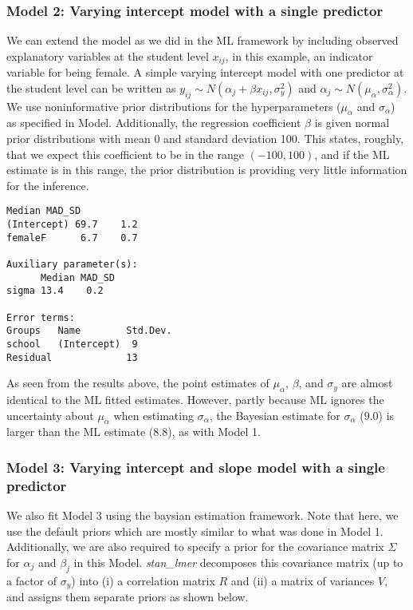 \subsubsection*{Model 2: Varying intercept model with a single predictor}
We can extend the model as we did in the ML framework by including observed explanatory variables at the student level $x_{ij}$, in this example, an indicator variable for being female. A simple varying intercept model with one predictor at the student level can be written as $y_{ij} \sim N(\alpha_{j} + \beta x_{ij}, \sigma_{y}^{2})$ and $\alpha_{j} \sim N(\mu_{\alpha}, \sigma_{\alpha}^{2})$. We use noninformative prior distributions for the hyperparameters ($\mu_{\alpha}$ and $\sigma_{\alpha}$) as specified in Model. Additionally, the regression coefficient $\beta$ is given normal prior distributions with mean 0 and standard deviation 100. This states, roughly, that we expect this coefficient to be in the range $(-100, 100)$, and if the ML estimate is in this range, the prior distribution is providing very little information for the inference.  

\newpage
\begin{Verbatim}[frame=single]
            Median MAD_SD
(Intercept) 69.7    1.2  
femaleF      6.7    0.7  

Auxiliary parameter(s):
      Median MAD_SD
sigma 13.4    0.2  

Error terms:
Groups   Name        Std.Dev.
school   (Intercept)  9      
Residual             13    
\end{Verbatim}
As seen from the results above, the point estimates of $\mu_{\alpha}$, $\beta$, and $\sigma_{y}$ are almost identical to the ML fitted estimates. However, partly because ML ignores the uncertainty about $\mu_{\alpha}$ when estimating $\sigma_{\alpha}$, the Bayesian estimate for $\sigma_{\alpha}$ ($9.0$) is larger than the ML estimate ($8.8$), as with Model 1.

\subsubsection*{Model 3: Varying intercept and slope model with a single predictor}

We also fit Model 3 using the baysian estimation framework.  Note that here, we use the default priors which are mostly similar to what was done in Model 1.  Additionally, we are also required to specify a prior for the covariance matrix $\Sigma$ for $\alpha_j$ and $\beta_j$ in this Model.  \textit{stan\_lmer} decomposes this covariance matrix (up to a factor of $\sigma_y$) into (i) a correlation matrix $R$ and (ii) a matrix of variances $V$, and assigns them separate priors as shown below.

